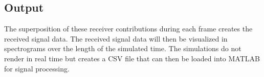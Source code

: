 

\subsection{Output}
The superposition of these receiver contributions during each frame creates the received signal data. The received signal data will then be visualized in spectrograms over the length of the simulated time. The simulations do not render in real time but creates a CSV file that can then be loaded into MATLAB for signal processing.




